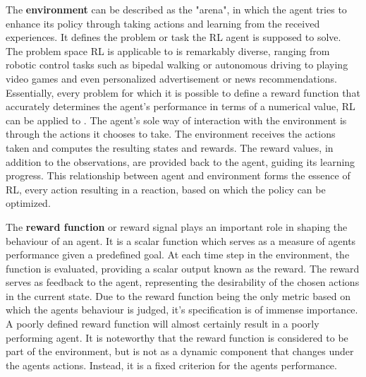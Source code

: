 
The \textbf{environment}  can be described as the "arena", in which the agent tries to enhance its policy through taking actions and learning from the received experiences.
It defines the problem or task the RL agent is supposed to solve.
The problem space RL is applicable to is remarkably diverse, ranging from robotic control tasks such as bipedal walking or autonomous driving to playing video games and even personalized advertisement or news recommendations.
Essentially, every problem for which it is possible to define a reward function that accurately determines the agent's performance in terms of a numerical value, RL can be applied to \parencite{silver2015}.
The agent's sole way of interaction with the environment is through the actions it chooses to take.
The environment receives the actions taken and computes the resulting states and rewards.
The reward values, in addition to the observations, are provided back to the agent, guiding its learning progress.
This relationship between agent and environment forms the essence of RL, every action resulting in a reaction, based on which the policy can be optimized.


\begin{comment}
Using the RL toolbox, 2 distinct types of environment are provided which differ in the definition of their action space.
If an environment has a discrete action space, it means that there exists countable, discrete actions which can be taken.
Discrete action spaces are used when the number of possible actions is limited and known in advance.
An example of such an environment would be a game of chess; for each turn there is a finite number of available moves.
Continuous action spaces on the other hand have a continuum of actions which can be taken and are used when the number of possible actions is infinite, such as the movement possibilities of a robotic arm.	
\end{comment}

The \textbf{reward function} or reward signal plays an important role in shaping the behaviour of an agent.
It is a scalar function which serves as a measure of agents performance given a predefined goal.
At each time step in the environment, the function is evaluated, providing a scalar output known as the reward.
The reward serves as feedback to the agent, representing the desirability of the chosen actions in the current state.
Due to the reward function being the only metric based on which the agents behaviour is judged, it's specification is of immense importance.
A poorly defined reward function will almost certainly result in a poorly performing agent.
It is noteworthy that the reward function is considered to be part of the environment, but is not as a dynamic component that changes under the agents actions.
Instead, it is a fixed criterion for the agents performance.
\parencite{sutton2018reinforcement}

